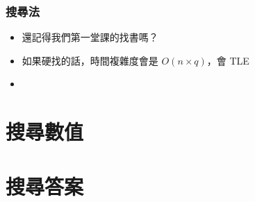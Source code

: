 \documentclass[mathserif]{beamer}
\begin{document}
\begin{frame}
    \frametitle{搜尋法}
    \begin{itemize}
        \item 還記得我們第一堂課的找書嗎？
        \item 如果硬找的話，時間複雜度會是 $O(n \times q)$，會 TLE
        \item<2-> 
    \end{itemize}
\end{frame}

\section{搜尋數值}

\section{搜尋答案}
\end{document}
